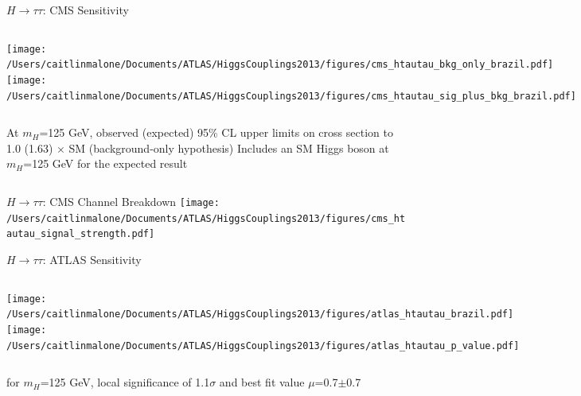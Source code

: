 \documentclass{beamer}
\begin{document}
\begin{frame}{$H\rightarrow \tau \tau$: CMS Sensitivity}
	\begin{columns}[c]
			\texttt{[image: /Users/caitlinmalone/Documents/ATLAS/HiggsCouplings2013/figures/cms\_htautau\_bkg\_only\_brazil.pdf]}\\
			\texttt{[image: /Users/caitlinmalone/Documents/ATLAS/HiggsCouplings2013/figures/cms\_htautau\_sig\_plus\_bkg\_brazil.pdf]}\\
	\end{columns}	
	
	\begin{columns}
			\scriptsize 
			At $m_H$=125 GeV, observed (expected) 95\% CL upper limits on cross section to 1.0 (1.63) $\times$ SM (background-only hypothesis)
			\scriptsize
			Includes an SM Higgs boson at $m_H$=125 GeV for the expected result 
	\end{columns}	

\end{frame}


\begin{frame}{$H\rightarrow \tau \tau$: CMS Channel Breakdown}
	\texttt{[image: /Users/caitlinmalone/Documents/ATLAS/HiggsCouplings2013/figures/cms\_htautau\_signal\_strength.pdf]}
\end{frame}



\begin{frame}{$H\rightarrow\tau\tau$: ATLAS Sensitivity}
	\begin{columns}[c]
		\column{0.5\textwidth}
			\texttt{[image: /Users/caitlinmalone/Documents/ATLAS/HiggsCouplings2013/figures/atlas\_htautau\_brazil.pdf]}
		\column{0.5\textwidth}
			\texttt{[image: /Users/caitlinmalone/Documents/ATLAS/HiggsCouplings2013/figures/atlas\_htautau\_p\_value.pdf]}
	\end{columns}
	\scriptsize
	for $m_H$=125 GeV, local significance of 1.1$\sigma$ and best fit value $\mu$=0.7$\pm$0.7
\end{frame}
\end{document}
